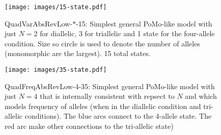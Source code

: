 \documentclass{llncs}
\newcommand{\virtPopSize}{\ensuremath{N}}
\newcommand{\pomo}{PoMo\xspace}
\begin{document}
\begin{figure}
    \begin{center}
        \texttt{[image: images/15-state.pdf]}
        \caption{QuadVarAbsRevLow-$\ast$-15: Simplest general \pomo-like model with just $\virtPopSize=2$ for diallelic, 3 for triallelic and 1 state for the four-allele condition. Size so circle is used to denote the number of alleles (monomorphic are the largest). 15 total states.}\label{pomoQuadVarAbsRevLow}
    \end{center}
\end{figure}

\begin{figure}
    \begin{center}
        \texttt{[image: images/35-state.pdf]}
        \caption{QuadFreqAbsRevLow-4-35: Simplest general \pomo-like model with just $\virtPopSize=4$ that is internally consistent with repsect to $\virtPopSize$ and which models frequency of alleles (when in the diallelic condition and tri-allelic conditions). The blue arcs connect to the 4-allele state. The red arc  make other connections to the tri-allelic state)}\label{pomoQuadVarAbsRevLow}
    \end{center}
\end{figure}



\end{document}
